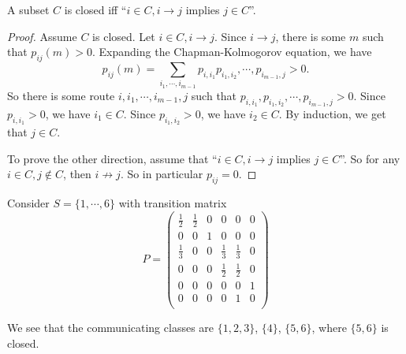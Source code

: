 \documentclass[a4paper]{article}
\begin{document}
\begin{prop}
  A subset $C$ is closed iff ``$i\in C, i\to j$ implies $j \in C$''.
\end{prop}

\begin{proof}
  Assume $C$ is closed. Let $i \in C, i \to j$. Since $i \to j$, there is some $m$ such that $p_{ij}(m) > 0$. Expanding the Chapman-Kolmogorov equation, we have
  \[
    p_{ij}(m) = \sum_{i_1, \cdots, i_{m - 1}} p_{i, i_1}p_{i_1, i_2}, \cdots, p_{i_{m - 1},j} > 0.
  \]
  So there is some route $i, i_1, \cdots, i_{m - 1}, j$ such that $p_{i, i_1}, p_{i_1, i_2}, \cdots, p_{i_{m - 1}, j} > 0$. Since $p_{i, i_1} > 0$, we have $i_1\in C$. Since $p_{i_1,i_2} > 0$, we have $i_2\in C$. By induction, we get that $j \in C$.

  To prove the other direction, assume that ``$i\in C, i \to j$ implies $j\in C$''. So for any $i\in C, j\not\in C$, then $i\not\to j$. So in particular $p_{ij} = 0$.
\end{proof}

\begin{eg}
  Consider $S = \{1, \cdots, 6\}$ with transition matrix
  \[
    P =
    \begin{pmatrix}
      \frac{1}{2} & \frac{1}{2} & 0 & 0 & 0 & 0\\
      0 & 0 & 1 & 0 & 0 & 0\\
      \frac{1}{3} & 0 & 0 & \frac{1}{3} & \frac{1}{3} & 0\\
      0 & 0 & 0 & \frac{1}{2} & \frac{1}{2} & 0\\
      0 & 0 & 0 & 0 & 0 & 1\\
      0 & 0 & 0 & 0 & 1 & 0\\
    \end{pmatrix}
  \]
  \begin{center}
  \end{center}
  We see that the communicating classes are $\{1, 2, 3\}$, $\{4\}$, $\{5, 6\}$, where $\{5, 6\}$ is closed.
\end{eg}
\end{document}
